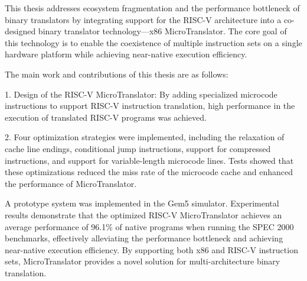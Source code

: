 This thesis addresses ecosystem fragmentation and the performance bottleneck of binary translators by integrating support for the RISC-V architecture into a co-designed binary translator technology—x86 MicroTranslator. The core goal of this technology is to enable the coexistence of multiple instruction sets on a single hardware platform while achieving near-native execution efficiency.

The main work and contributions of this thesis are as follows:

1. Design of the RISC-V MicroTranslator:
By adding specialized microcode instructions to support RISC-V instruction translation, high performance in the execution of translated RISC-V programs was achieved.

2. Four optimization strategies were implemented, including the relaxation of cache line endings, conditional jump instructions, support for compressed instructions, and support for variable-length microcode lines. Tests showed that these optimizations reduced the miss rate of the microcode cache and enhanced the performance of MicroTranslator.

A prototype system was implemented in the Gem5 simulator. Experimental results demonstrate that the optimized RISC-V MicroTranslator achieves an average performance of 96.1\% of native programs when running the SPEC 2000 benchmarks, effectively alleviating the performance bottleneck and achieving near-native execution efficiency. By supporting both x86 and RISC-V instruction sets, MicroTranslator provides a novel solution for multi-architecture binary translation.


\pagestyle{enfrontmatterstyle}%
\cleardoublepage\pagestyle{frontmatterstyle}%

